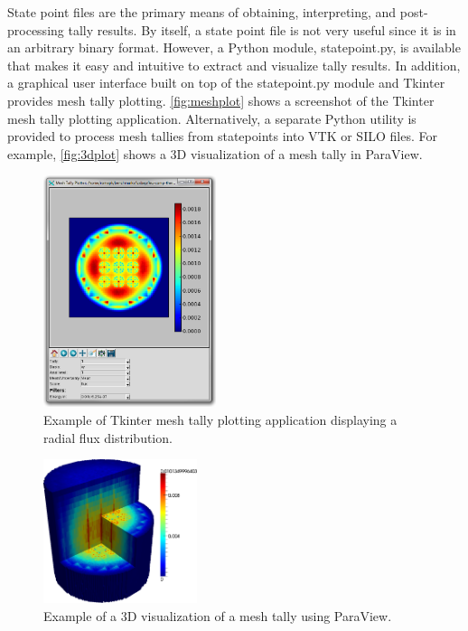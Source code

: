 \documentclass[5p,authoryear]{elsarticle}
\begin{document}
State point files are the primary means of obtaining, interpreting, and
post-processing tally results.  By itself, a state point file is not very useful
since it is in an arbitrary binary format. However, a Python module,
statepoint.py, is available that makes it easy and intuitive to extract and
visualize tally results. In addition, a graphical user interface built on top of
the statepoint.py module and Tkinter provides mesh tally
plotting. \autoref{fig:meshplot} shows a screenshot of the Tkinter mesh tally
plotting application. Alternatively, a separate Python utility is provided to
process mesh tallies from statepoints into VTK or SILO files.  For example,
\autoref{fig:3dplot} shows a 3D visualization of a mesh tally in ParaView.
\begin{figure}[htb]
  \centering
  \includegraphics[width=0.45\textwidth]{images/plotmeshtally.png}
  \caption{Example of Tkinter mesh tally plotting application displaying a
    radial flux distribution.}
  \label{fig:meshplot}
\end{figure}
\begin{figure}[htb]
  \centering
  \includegraphics[width=0.4\textwidth]{images/tallyplot.png}
  \caption{Example of a 3D visualization of a mesh tally using ParaView.}
  \label{fig:3dplot}
\end{figure}
\end{document}

